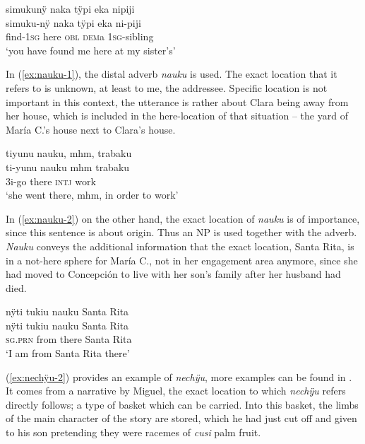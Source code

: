\ea\label{ex:naka-2}
\begingl
\glpreamble simukunÿ naka tÿpi eka nipiji\\
\gla simuku-nÿ naka tÿpi eka ni-piji\\
\glb find-1\textsc{sg} here \textsc{obl} \textsc{dem}a 1\textsc{sg}-sibling\\
\glft ‘you have found me here at my sister’s’
\endgl
\trailingcitation{[cux-120410ls.007]}
\xe

In (\ref{ex:nauku-1}), the distal adverb \textit{nauku} is used. The exact location that it refers to is unknown, at least to me, the addressee. Specific location is not important in this context, the utterance is rather about Clara being away from her house, which is included in the here-location of that situation – the yard of María C.’s house next to Clara’s house.

\ea\label{ex:nauku-1}
\begingl
\glpreamble tiyunu nauku, mhm, trabaku\\
\gla ti-yunu nauku mhm trabaku\\
\glb 3i-go there \textsc{intj} work\\
\glft ‘she went there, mhm, in order to work’
\endgl
\trailingcitation{[uxx-e120427l.089]}
\xe

In (\ref{ex:nauku-2}) on the other hand, the exact location of \textit{nauku} is of importance, since this sentence is about origin. Thus an NP is used together with the adverb. \textit{Nauku} conveys the additional information that the exact location, Santa Rita, is in a not-here sphere for María C., not in her engagement area anymore, since she had moved to Concepción to live with her son’s family after her husband had died.


\ea\label{ex:nauku-2}
\begingl
\glpreamble nÿti tukiu nauku Santa Rita\\
\gla nÿti tukiu nauku {Santa Rita}\\
\textsc{sg.prn} from there {Santa Rita}\\
\glft ‘I am from Santa Rita there’
\endgl
\trailingcitation{[cux-120410ls.010]}
\xe


(\ref{ex:nechÿu-2}) provides an example of \textit{nechÿu}, more examples can be found in . It comes from a narrative by Miguel, the exact location to which \textit{nechÿu} refers directly follows; a type of basket which can be carried. Into this basket, the limbs of the main character of the story are stored, which he had just cut off and given to his son pretending they were racemes of \textit{cusi} palm fruit.

